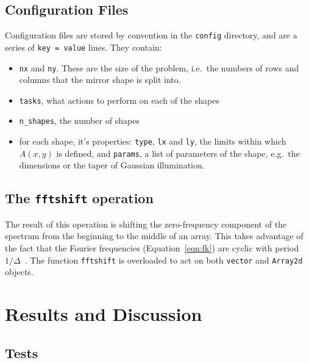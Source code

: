\documentclass[11pt]{article}
\begin{document}
\subsection{Configuration Files}
Configuration files are stored by convention in the \texttt{config} directory, and are a series of \texttt{key = value} lines. They contain:
\begin{itemize}
    \item \texttt{nx} and \texttt{ny}. These are the size of the problem, i.e.\ the numbers of rows and columns that the mirror shape is split into.
    \item \texttt{tasks}, what actions to perform on each of the shapes
    \item \texttt{n\_shapes}, the number of shapes
    \item for each shape, it's properties: \texttt{type}, \texttt{lx} and \texttt{ly}, the limits within which $A(x,y)$ is defined, and \texttt{params}, a list of parameters of the shape, e.g.\ the dimensions or the taper of Gaussian illumination.
\end{itemize}

\subsection{The \texttt{fftshift} operation}
The result of this operation is shifting the zero-frequency component of the spectrum from the beginning to the middle of an array. This takes advantage of the fact that the Fourier frequencies (Equation~\ref{eqn:fk}) are cyclic with period $1/\Delta$~\cite[Section~12.1.2]{NumRecipes}. The function \texttt{fftshift} is overloaded to act on both \texttt{vector} and \texttt{Array2d} objects.

\section{Results and Discussion}\label{sec:res}
\subsection{Tests}
\end{document}
